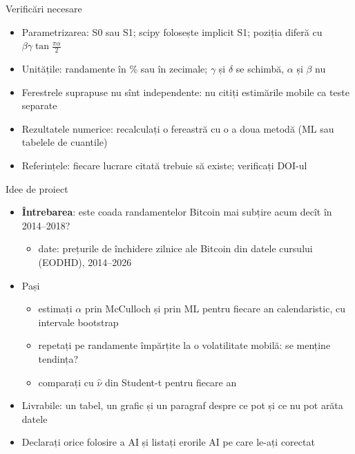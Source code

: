 \begin{frame}{Verificări necesare}
\itemsize{\small}
\begin{itemize}
    \item Parametrizarea: S0 sau S1; scipy folosește implicit S1; poziția diferă cu $\beta\gamma\tan\frac{\pi\alpha}{2}$
    \item Unitățile: randamente în \% sau în zecimale; $\gamma$ și $\delta$ se schimbă, $\alpha$ și $\beta$ nu
    \item Ferestrele suprapuse nu sînt independente: nu citiți estimările mobile ca teste separate
    \item Rezultatele numerice: recalculați o fereastră cu o a doua metodă (ML sau tabelele de cuantile)
    \item Referințele: fiecare lucrare citată trebuie să existe; verificați DOI-ul
\end{itemize}
\end{frame}

\begin{frame}{Idee de proiect}
\itemsize{\small}
\begin{itemize}
    \item \textbf{Întrebarea}: este coada randamentelor Bitcoin mai subțire acum decît în 2014--2018?
    \begin{itemize}
        \item date: prețurile de închidere zilnice ale Bitcoin din datele cursului (EODHD), 2014--2026
    \end{itemize}
    \item Pași
    \begin{itemize}
        \item estimați $\alpha$ prin McCulloch și prin ML pentru fiecare an calendaristic, cu intervale bootstrap
        \item repetați pe randamente împărțite la o volatilitate mobilă: se menține tendința?
        \item comparați cu $\hat\nu$ din Student-t pentru fiecare an
    \end{itemize}
    \item Livrabile: un tabel, un grafic și un paragraf despre ce pot și ce nu pot arăta datele
    \item Declarați orice folosire a AI și listați erorile AI pe care le-ați corectat
\end{itemize}
\end{frame}



